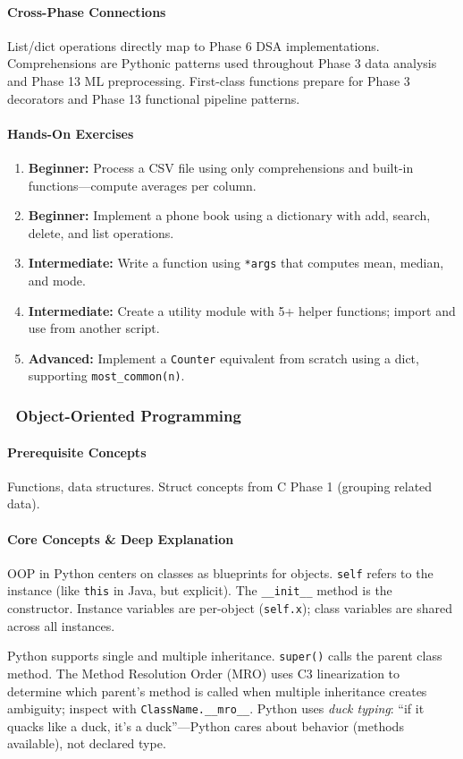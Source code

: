 \documentclass[11pt, a4paper, oneside]{report}
\newcommand{\mustmaster}[1]{\subsubsection{\texorpdfstring{\fcolorbox{blue!40!black}{blue!8}{\footnotesize\bfseries\color{blue!40!black} MUST MASTER}~#1}{#1}}}
\begin{document}
\paragraph{Cross-Phase Connections} List/dict operations directly map to Phase 6 DSA implementations. Comprehensions are Pythonic patterns used throughout Phase 3 data analysis and Phase 13 ML preprocessing. First-class functions prepare for Phase 3 decorators and Phase 13 functional pipeline patterns.

\paragraph{Hands-On Exercises}
\begin{enumerate}[leftmargin=*]
\item \textbf{Beginner:} Process a CSV file using only comprehensions and built-in functions---compute averages per column.
\item \textbf{Beginner:} Implement a phone book using a dictionary with add, search, delete, and list operations.
\item \textbf{Intermediate:} Write a function using \texttt{*args} that computes mean, median, and mode.
\item \textbf{Intermediate:} Create a utility module with 5+ helper functions; import and use from another script.
\item \textbf{Advanced:} Implement a \texttt{Counter} equivalent from scratch using a dict, supporting \texttt{most\_common(n)}.
\end{enumerate}

\mustmaster{Object-Oriented Programming}

\paragraph{Prerequisite Concepts} Functions, data structures. Struct concepts from C Phase 1 (grouping related data).

\paragraph{Core Concepts \& Deep Explanation} OOP in Python centers on classes as blueprints for objects. \texttt{self} refers to the instance (like \texttt{this} in Java, but explicit). The \texttt{\_\_init\_\_} method is the constructor. Instance variables are per-object (\texttt{self.x}); class variables are shared across all instances.

Python supports single and multiple inheritance. \texttt{super()} calls the parent class method. The Method Resolution Order (MRO) uses C3 linearization to determine which parent's method is called when multiple inheritance creates ambiguity; inspect with \texttt{ClassName.\_\_mro\_\_}. Python uses \emph{duck typing}: ``if it quacks like a duck, it's a duck''---Python cares about behavior (methods available), not declared type.
\end{document}
